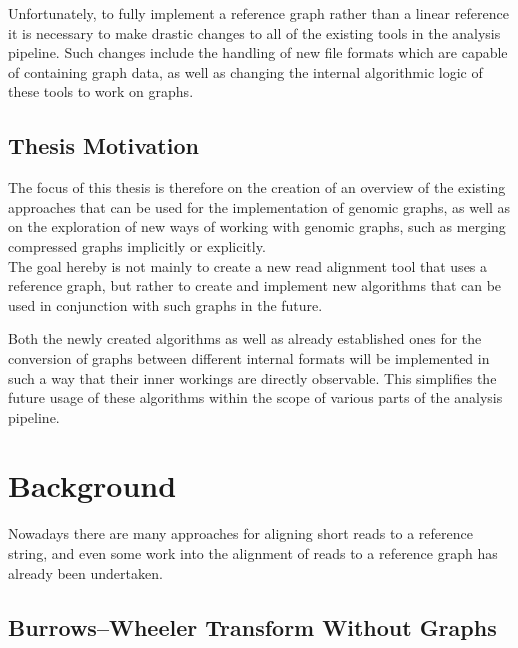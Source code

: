 \documentclass[a4paper,12pt,twoside,BCOR=10mm]{scrbook}
\begin{document}
Unfortunately, to fully implement a reference graph rather than a linear reference 
it is necessary to make drastic changes to all of the existing tools in the analysis pipeline. 
Such changes include the handling of new file formats which are capable of containing graph data, 
as well as changing the internal algorithmic logic of these tools to work on graphs.

\section{Thesis Motivation}

The focus of this thesis is therefore on the creation of an overview of the existing 
approaches that can be used for the implementation of genomic graphs, 
as well as on the exploration of new ways of working with genomic graphs, 
such as merging compressed graphs implicitly or explicitly. \\
The goal hereby is not mainly to create a new read alignment tool that uses 
a reference graph, but rather to create and implement new algorithms that can 
be used in conjunction with such graphs in the future.

Both the newly created algorithms as well as already established ones 
for the conversion of graphs between different internal formats 
will be implemented in such a way that their inner workings 
are directly observable. This simplifies the future usage of these algorithms 
within the scope of various parts of the analysis pipeline.

\chapter{Background}
%

Nowadays there are many approaches for aligning short reads to a reference string, 
and even some work into the alignment of reads to a reference graph has already been 
undertaken.

\section{Burrows--Wheeler Transform Without Graphs}
\end{document}
